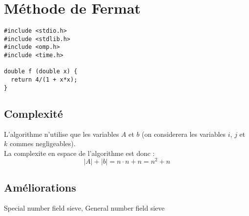 \section{Méthode de Fermat}
    \begin{lstlisting}
#include <stdio.h>
#include <stdlib.h>
#include <omp.h>
#include <time.h>

double f (double x) {
  return 4/(1 + x*x);
}
    \end{lstlisting}
    

    \subsection{Complexité}
        
        L'algorithme n'utilise que les variables $A$ et $b$ (on considerera les variables $i$, $j$ et $k$ commes negligeables).\\
        La complexite en espace de l'algorithme est donc : $$\lvert A \rvert + \lvert b \rvert = n \cdot n + n = n ^2 +n$$
    
    \subsection{Améliorations}
    
    Special number field sieve, General number field sieve